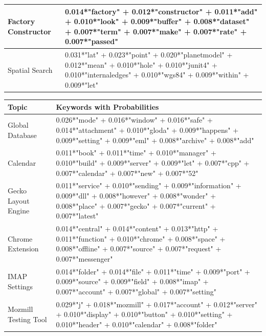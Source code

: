 \documentclass[a4paper,12pt,twoside]{report}
\begin{document}
\begin{table}
\begin{adjustbox}{max width=\columnwidth}
\begin{tabular}{p{3cm} p{12cm}}
			\midrule 
			Factory Constructor & 0.014*"factory" + 0.012*"constructor" + 0.011*"add" + 0.010*"look" + 0.009*"buffer" + 0.008*"dataset" + 0.007*"term" + 0.007*"make" + 0.007*"rate" + 0.007*"passed" \\
			\midrule 
			Spatial Search & 0.031*"lat" + 0.023*"point" + 0.020*"planetmodel" + 0.012*"mean" + 0.010*"hole" + 0.010*"junit4" + 0.010*"internaledges" + 0.010*"wgs84" + 0.009*"within" + 0.009*"let" \\
        \midrule
    \end{tabular}
    \end{adjustbox}
    \label{tab:tmLucene}
\end{table} 

\begin{table} %
    \centering
    \begin{adjustbox}{max width=\columnwidth}
    \def\arraystretch{1} %
    \begin{tabular}{p{3cm} p{12cm}}
        \toprule
        \textbf{Topic} & \textbf{Keywords with Probabilities}\\
        \midrule
			Global Database & 0.026*"mode" + 0.016*"window" + 0.016*"safe" + 0.014*"attachment" + 0.010*"gloda" + 0.009*"happens" + 0.009*"setting" + 0.009*"eml" + 0.008*"archive" + 0.008*"add" \\
			\midrule 
			Calendar & 0.011*"book" + 0.011*"time" + 0.010*"manager" + 0.010*"build" + 0.009*"server" + 0.009*"let" + 0.007*"cpp" + 0.007*"calendar" + 0.007*"new" + 0.007*"52" \\ 
			\midrule 
			Gecko Layout Engine & 0.011*"service" + 0.010*"sending" + 0.009*"information" + 0.009*"dll" + 0.008*"however" + 0.008*"wonder" + 0.008*"place" + 0.007*"gecko" + 0.007*"current" + 0.007*"latest" \\
			\midrule 
			Chrome Extension & 0.014*"central" + 0.014*"content" + 0.013*"http" + 0.011*"function" + 0.010*"chrome" + 0.008*"space" + 0.008*"offline" + 0.007*"source" + 0.007*"request" + 0.007*"messenger" \\
			\midrule 
			IMAP Settings & 0.014*"folder" + 0.014*"file" + 0.011*"time" + 0.009*"port" + 0.009*"source" + 0.009*"field" + 0.008*"imap" + 0.007*"account" + 0.007*"global" + 0.007*"setting" \\
			\midrule 
			Mozmill Testing Tool & 0.029*"j" + 0.018*"mozmill" + 0.017*"account" + 0.012*"server" + 0.010*"display" + 0.010*"button" + 0.010*"setting" + 0.010*"header" + 0.010*"calendar" + 0.008*"folder" \\

\end{tabular}
\end{adjustbox}
\end{table}
\end{document}
